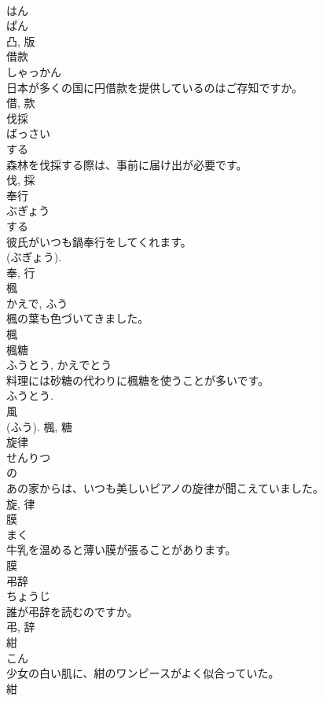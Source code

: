\documentclass[8pt]{extreport}
\begin{document}
\begin{CJK}{UTF8}{min}
\\	はん 
\\	ぱん 
\\	凸, 版	
\\	借款	
\\	しゃっかん	
\\	日本が多くの国に円借款を提供しているのはご存知ですか。	
\\	借, 款	
\\	伐採	
\\	ばっさい	
\\	する 
\\	森林を伐採する際は、事前に届け出が必要です。	
\\	伐, 採	
\\	奉行	
\\	ぶぎょう	
\\	する 
\\	彼氏がいつも鍋奉行をしてくれます。	
\\	(ぶぎょう). 
\\	奉, 行	
\\	楓	
\\	かえで, ふう	
\\	楓の葉も色づいてきました。	
\\	楓	
\\	楓糖	
\\	ふうとう, かえでとう	
\\	料理には砂糖の代わりに楓糖を使うことが多いです。	
\\	ふうとう. 
\\	風 
\\	(ふう).	楓, 糖	
\\	旋律	
\\	せんりつ	
\\	の 
\\	あの家からは、いつも美しいピアノの旋律が聞こえていました。	
\\	旋, 律	
\\	膜	
\\	まく	
\\	牛乳を温めると薄い膜が張ることがあります。	
\\	膜	
\\	弔辞	
\\	ちょうじ	
\\	誰が弔辞を読むのですか。	
\\	弔, 辞	
\\	紺	
\\	こん	
\\	少女の白い肌に、紺のワンピースがよく似合っていた。	
\\	紺	

\end{CJK}
\end{document}
